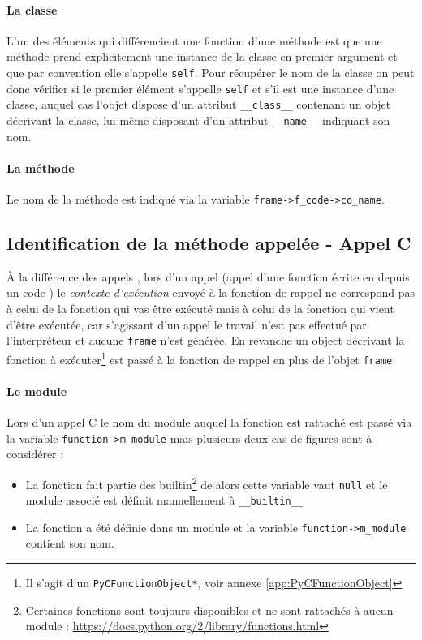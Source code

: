 \paragraph*{La classe} L'un des éléments qui différencient une fonction d'une méthode est que une méthode prend explicitement une instance de la classe en premier argument et que par convention elle s'appelle \verb|self|. Pour récupérer le nom de la classe on peut donc vérifier si le premier élément s'appelle \verb|self| et s'il est une instance d'une classe, auquel cas l'objet dispose d'un attribut \verb|__class__| contenant un objet décrivant la classe, lui même disposant d'un attribut \verb|__name__| indiquant son nom.

\paragraph*{La méthode} Le nom de la méthode est indiqué via la variable \verb|frame->f_code->co_name|.

\subsection{Identification de la méthode appelée - Appel C}
À la différence des appels \Python, lors d'un appel \C (appel d'une fonction écrite en \C depuis un code \Python) le \emph{\gls{contexte d'exécution}} envoyé à la fonction de rappel ne correspond pas à celui de la fonction qui vas être exécuté mais à celui de la fonction qui vient d'être exécutée, car s'agissant d'un appel \C le travail n'est pas effectué par l'interpréteur et aucune \verb|frame| n'est générée. En revanche un object décrivant la fonction \C à exécuter\footnote{Il s'agit d'un \verb|PyCFunctionObject*|, voir annexe \vref{app:PyCFunctionObject}} est passé à la fonction de rappel en plus de l'objet \verb|frame|

\paragraph*{Le module} Lors d'un appel C le nom du module auquel la fonction est rattaché est passé via la variable \verb|function->m_module| mais plusieurs deux cas de figures sont à considérer : 
\begin{itemize}
\item La fonction fait partie des builtin\footnote{Certaines fonctions sont toujours disponibles et ne sont rattachés à aucun module : \url{https://docs.python.org/2/library/functions.html}} de \Python alors cette variable vaut \verb|null| et le module associé est définit manuellement à \verb|__builtin__|
\item La fonction a été définie dans un module et la variable \verb|function->m_module| contient son nom.
\end{itemize}

